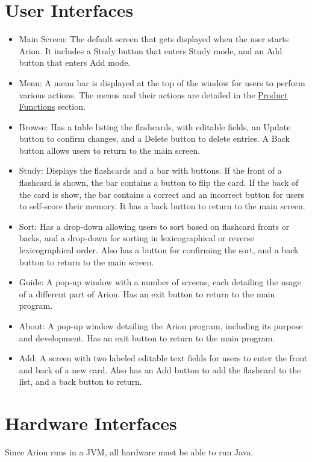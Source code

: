 \documentclass{scrreprt}
\begin{document}
\section{User Interfaces}
\begin{itemize}
    \item
        Main Screen: The default screen that gets displayed when the user starts Arion.
        It includes a Study button that enters Study mode,
        and an Add button that enters Add mode.
    \item
        Menu: A menu bar is displayed at the top of the window for users to perform various actions.
        The menus and their actions are detailed in the \hyperref[sec:Product Functions]{Product Functions} section.
    \item 
        Browse: Has a table listing the flashcards, with editable fields, an Update button to confirm changes,
        and a Delete button to delete entries. A Back button allows users to return to the main screen.
    \item
        Study: Displays the flashcards and a bar with buttons.
        If the front of a flashcard is shown, the bar contains a button to flip the card. 
        If the back of the card is show, the bar contains a correct and an incorrect button for users to self-score
        their memory. It has a back button to return to the main screen.
    \item 
        Sort: Has a drop-down allowing users to sort based on flashcard fronts or backs,
        and a drop-down for sorting in lexicographical or reverse lexicographical order. 
        Also has a button for confirming the sort, and a back button to return to the main screen.
    \item 
        Guide: A pop-up window with a number of screens, each detailing the usage of a
        different part of Arion. Has an exit button to return to the main program.
    \item 
        About: A pop-up window detailing the Arion program, including its purpose and development.
        Has an exit button to return to the main program.
    \item 
        Add: A screen with two labeled editable text fields for users to enter the front and
        back of a new card. Also has an Add button to add the flashcard to the list, and
        a back button to return.
\end{itemize}

\section{Hardware Interfaces}
Since Arion runs in a JVM, all hardware must be able to run Java.
\end{document}
